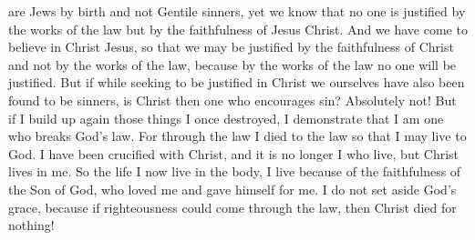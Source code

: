 {are Jews
by birth
and
not
Gentile
sinners,
yet
we know
that
no
one
is justified
by
the works
of
the law
but
by
the faithfulness
of Jesus
Christ.
And
we
have come to believe
in
Christ
Jesus,
so that
we may be justified
by
the faithfulness
of Christ
and
not
by
the works
of
the law,
because
by
the works
of
the law
no
one
will be justified.
But
if
while seeking
to be justified
in
Christ
we
ourselves
have
also
been found
to be sinners,
is Christ
then
one who encourages
sin? Absolutely
not!
But if
I build up
again
those things
I once destroyed,
I demonstrate
that I
am one who breaks God’s law.
For
through
the law
I died
to the law
so that
I may live
to God.
I have been crucified
with Christ,
and
it is no longer
I
who live,
but
Christ
lives
in
me.
So
the life I
now
live
in
the body,
I live
because of the faithfulness
of the Son
of God,
who loved
me
and
gave
himself
for
me.
I do
not
set aside
God’s
grace,
because
if
righteousness
could come through
the law,
then
Christ
died
for nothing!

}
